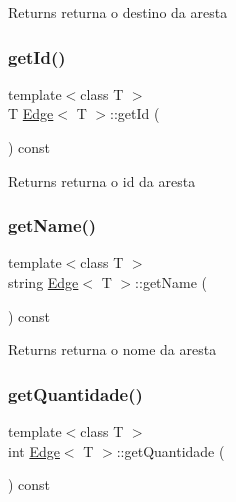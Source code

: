 \begin{DoxyReturn}{Returns}
returna o destino da aresta 
\end{DoxyReturn}
\mbox{\label{class_edge_a494c97c4dec2e84810729834485f5863}} 
\subsubsection{\texorpdfstring{get\+Id()}{getId()}}
{\footnotesize\ttfamily template$<$class T $>$ \\
T \mbox{\hyperlink{class_edge}{Edge}}$<$ T $>$\+::get\+Id (\begin{DoxyParamCaption}{ }\end{DoxyParamCaption}) const}

\begin{DoxyReturn}{Returns}
returna o id da aresta 
\end{DoxyReturn}
\mbox{\label{class_edge_ac983418ce88a0c00eb86064e7731f075}} 
\subsubsection{\texorpdfstring{get\+Name()}{getName()}}
{\footnotesize\ttfamily template$<$class T $>$ \\
string \mbox{\hyperlink{class_edge}{Edge}}$<$ T $>$\+::get\+Name (\begin{DoxyParamCaption}{ }\end{DoxyParamCaption}) const}

\begin{DoxyReturn}{Returns}
returna o nome da aresta 
\end{DoxyReturn}
\mbox{\label{class_edge_acbd28aa046af584e2ff2667ea726b56a}} 
\subsubsection{\texorpdfstring{get\+Quantidade()}{getQuantidade()}}
{\footnotesize\ttfamily template$<$class T $>$ \\
int \mbox{\hyperlink{class_edge}{Edge}}$<$ T $>$\+::get\+Quantidade (\begin{DoxyParamCaption}{ }\end{DoxyParamCaption}) const}

